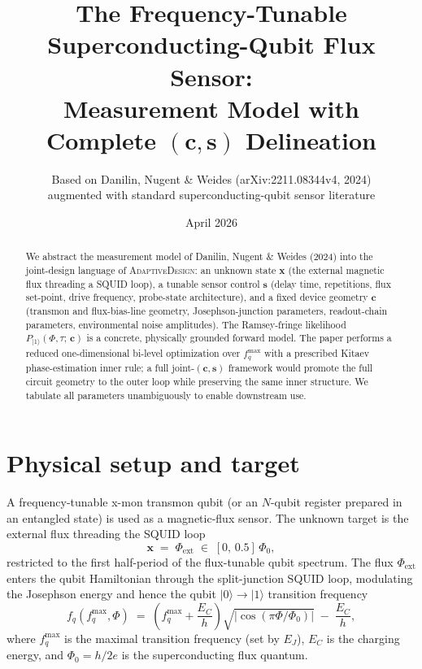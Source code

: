 \documentclass[11pt,a4paper]{article}
\title{The Frequency-Tunable Superconducting-Qubit Flux Sensor:\\
       Measurement Model with Complete \texorpdfstring{$(\bm{c},\bm{s})$}{(c,s)} Delineation}
\author{Based on Danilin, Nugent \& Weides (arXiv:2211.08344v4, 2024)\\
        augmented with standard superconducting-qubit sensor literature}
\date{April 2026}
\newcommand{\Phizero}{\Phi_0}
\begin{document}
\maketitle

\begin{abstract}
We abstract the measurement model of Danilin, Nugent \& Weides (2024) into the joint-design language of \textsc{AdaptiveDesign}: an unknown state $\bm{x}$ (the external magnetic flux threading a SQUID loop), a tunable sensor control $\bm{s}$ (delay time, repetitions, flux set-point, drive frequency, probe-state architecture), and a fixed device geometry $\bm{c}$ (transmon and flux-bias-line geometry, Josephson-junction parameters, readout-chain parameters, environmental noise amplitudes).  The Ramsey-fringe likelihood $P_{|1\rangle}(\Phi,\tau;\,\bm{c})$ is a concrete, physically grounded forward model.  The paper performs a reduced one-dimensional bi-level optimization over $f_q^{\max}$ with a prescribed Kitaev phase-estimation inner rule; a full joint-$(\bm{c},\bm{s})$ framework would promote the full circuit geometry to the outer loop while preserving the same inner structure.  We tabulate all parameters unambiguously to enable downstream use.
\end{abstract}

\section{Physical setup and target}

A frequency-tunable x-mon transmon qubit (or an $N$-qubit register prepared in an entangled state) is used as a magnetic-flux sensor.  The unknown target is the external flux threading the SQUID loop
\begin{equation}
  \bm{x} \;=\; \Phi_\text{ext} \;\in\; [0,\,0.5]\,\Phizero,
\end{equation}
restricted to the first half-period of the flux-tunable qubit spectrum.  The flux $\Phi_\text{ext}$ enters the qubit Hamiltonian through the split-junction SQUID loop, modulating the Josephson energy and hence the qubit $|0\rangle\!\to\!|1\rangle$ transition frequency
\begin{equation}
  f_q(f_q^{\max},\Phi) \;=\; \left(f_q^{\max} + \frac{E_C}{h}\right)\sqrt{\bigl|\cos(\pi\Phi/\Phizero)\bigr|} \;-\; \frac{E_C}{h},
  \label{eq:fq}
\end{equation}
where $f_q^{\max}$ is the maximal transition frequency (set by $E_J$), $E_C$ is the charging energy, and $\Phizero = h/2e$ is the superconducting flux quantum.
\end{document}
